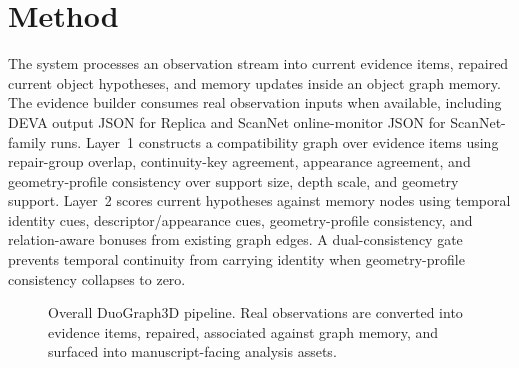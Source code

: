 \documentclass[11pt]{article}
\begin{document}
\section{Method}
The system processes an observation stream into current evidence items, repaired current object hypotheses, and memory updates inside an object graph memory. The evidence builder consumes real observation inputs when available, including DEVA output JSON for Replica and ScanNet online-monitor JSON for ScanNet-family runs. Layer~1 constructs a compatibility graph over evidence items using repair-group overlap, continuity-key agreement, appearance agreement, and geometry-profile consistency over support size, depth scale, and geometry support. Layer~2 scores current hypotheses against memory nodes using temporal identity cues, descriptor/appearance cues, geometry-profile consistency, and relation-aware bonuses from existing graph edges. A dual-consistency gate prevents temporal continuity from carrying identity when geometry-profile consistency collapses to zero.

\begin{figure}[t]
\centering
{}
\caption{Overall DuoGraph3D pipeline. Real observations are converted into evidence items, repaired, associated against graph memory, and surfaced into manuscript-facing analysis assets.}
\end{figure}
\end{document}
